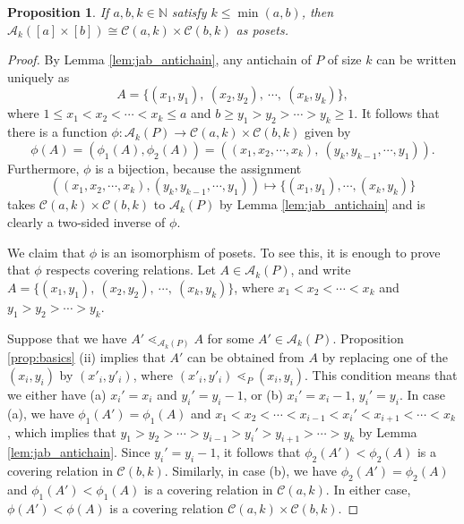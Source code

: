 \documentclass[11pt]{amsart}
\theoremstyle{plain}
\newtheorem{proposition}[theorem]{Proposition}
\theoremstyle{definition}
\theoremstyle{remark}
\numberwithin{equation}{section}
\newcommand{\ra}{\rightarrow}
\newcommand{\N}{\mathbb{N}}
\newcommand{\cala}{\mathcal{A}}
\newcommand{\calc}{\mathcal{C}}
\newcommand{\akp}{\mathcal{A}_k(P)}
\begin{document}
\begin{proposition}\label{prop:akab} 
If $a, b, k \in \N$ satisfy $k \leq \min(a, b)$, then 
$\cala_k([a]\times[b]) \cong \calc(a, k) \times \calc(b, k)$ as posets.
\end{proposition}

\begin{proof}
By Lemma \ref{lem:jab_antichain}, any antichain of $P$ of size $k$ can be
written uniquely as $$ A = \{ (x_1, y_1), \ (x_2, y_2), \ \cdots, \ (x_k, y_k)\}
,$$ where $1 \leq x_1 < x_2 < \cdots < x_k \leq a$ and $b \geq y_1 > y_2 >
\cdots > y_k \geq 1$. It follows that there is a function $\phi : \cala_k(P) \ra
\calc(a, k) \times \calc(b, k)$ given by $$ \phi(A) = (\phi_1(A), \phi_2(A)) =
((x_1, x_2, \cdots, x_k), \ (y_k, y_{k-1}, \cdots, y_1)) .$$ Furthermore, $\phi$
is a bijection, because the assignment \[((x_1, x_2,\cdots, x_k), (y_k,
y_{k-1},\cdots, y_1) )\mapsto \{(x_1,y_1), \cdots, (x_k,y_k)\}\] takes
$\calc(a,k)\times \calc(b,k)$ to $\akp$ by Lemma \ref{lem:jab_antichain} and is
clearly a two-sided inverse of $\phi$.

We claim that $\phi$ is an isomorphism of posets. To see this, it is enough to
prove that $\phi$ respects covering relations. Let $A \in \cala_k(P)$, and write
$A = \{ (x_1, y_1), \ (x_2, y_2), \ \cdots, \ (x_k, y_k)\}$, where $x_1 < x_2 <
\cdots < x_k$ and $y_1 > y_2 > \cdots > y_k$.

Suppose that we have $A' \lessdot_{\cala_k(P)} A$ for some $A'\in \akp$.
Proposition \ref{prop:basics} (ii) implies that $A'$ can be obtained from $A$ by
replacing one of the $(x_i, y_i)$ by $(x'_i, y'_i)$, where $(x'_i, y'_i)
\lessdot_P (x_i, y_i)$.  This condition means that we either have (a) $x_i'=x_i$
and $y_i'=y_i-1$, or (b) $x_i'=x_i-1$, $y_i'=y_i$. In case (a), we have
$\phi_1(A')=\phi_1(A)$ and $x_1<x_2<\cdots<x_{i-1}<x_i'<x_{i+1}<\cdots<x_k$,
which implies that $y_1>y_2>\cdots>y_{i-1}>y_i'>y_{i+1}>\cdots>y_k$ by Lemma
\ref{lem:jab_antichain}.  Since $y_i'=y_i-1$, it follows that
$\phi_2(A')<\phi_2(A)$ is a covering relation in $\calc(b, k)$.  Similarly, in
case (b), we have $\phi_2(A')=\phi_2(A)$ and $\phi_1(A')<\phi_1(A)$ is a
covering relation in $\calc(a, k)$.  In either case, $\phi(A') < \phi(A)$ is a
covering relation $\calc(a, k) \times \calc(b, k)$.


\end{proof}
\end{document}
